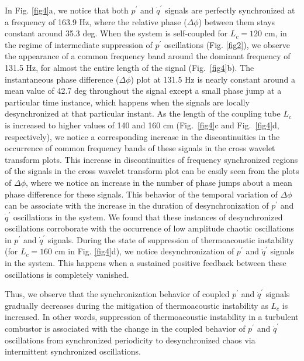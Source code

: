 \documentclass[twocolumn,10pt]{article} %
\begin{document}
In Fig. \ref{fig4}a, we notice that both $p^\prime$ and $\dot{q}^\prime$ signals are perfectly synchronized at a frequency of 163.9 Hz, where the relative phase ($\Delta\phi$) between them stays constant around 35.3 deg. When the system is self-coupled for $L_c = 120$ cm, in the regime of intermediate suppression of $p^\prime$ oscillations (Fig. \ref{fig2}), we observe the appearance of a common frequency band around the dominant frequency of 131.5 Hz, for almost the entire length of the signal (Fig.~\ref{fig4}b). The instantaneous phase difference ($\Delta\phi$) plot at 131.5 Hz is nearly constant around a mean value of 42.7 deg throughout the signal except a small phase jump at a particular time instance, which happens when the signals are locally desynchronized at that particular instant. As the length of the coupling tube $L_c$ is increased to higher values of 140 and 160 cm (Fig.~\ref{fig4}c and Fig.~\ref{fig4}d, respectively), we notice a corresponding increase in the discontinuities in the occurrence of common frequency bands of these signals in the cross wavelet transform plots. This increase in discontinuities of frequency synchronized regions of the signals in the cross wavelet transform plot can be easily seen from the plots of $\Delta\phi$, where we notice an increase in the number of phase jumps about a mean phase difference for these signals. This behavior of the temporal variation of $\Delta\phi$ can be associate with the increase in the duration of desynchronization of $p^\prime$ and $\dot{q}^\prime$ oscillations in the system. We found that these instances of desynchronized oscillations corroborate with the occurrence of low amplitude chaotic oscillations in $p^\prime$ and $\dot{q}^\prime$ signals. During the state of suppression of thermoacoustic instability (for $L_c = 160$ cm in Fig. \ref{fig4}d), we notice desynchronization of $p^\prime$ and $\dot{q}^\prime$ signals in the system. This happens when a sustained positive feedback between these oscillations is completely vanished. 

Thus, we observe that the synchronization behavior of coupled $p^\prime$ and $\dot{q}^\prime$ signals gradually decreases during the mitigation of thermoacoustic instability as $L_c$ is increased. In other words, suppression of thermoacoustic instability in a turbulent combustor is associated with the change in the coupled behavior of $p^\prime$ and $\dot{q}^\prime$ oscillations from synchronized periodicity to desynchronized chaos via intermittent synchronized oscillations.  
\end{document}
